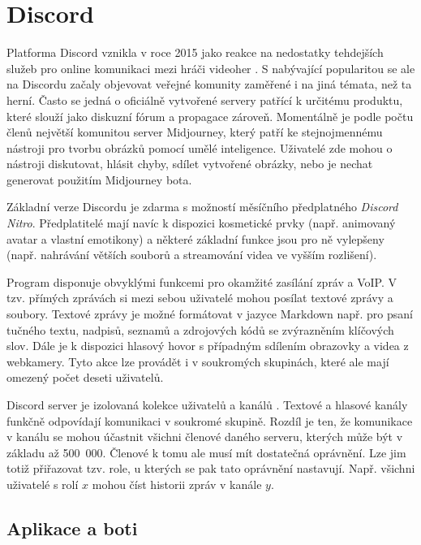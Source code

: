 \documentclass[FM]{tulthesis}
\begin{document}
	\section{Discord}
	
	Platforma Discord vznikla v roce 2015 jako reakce na nedostatky tehdejších služeb pro online komunikaci mezi hráči videoher \cite{lit_Discord}. S nabývající popularitou se ale na Discordu začaly objevovat veřejné komunity zaměřené i na jiná témata, než ta herní. Často se jedná o oficiálně vytvořené servery patřící k určitému produktu, které slouží jako diskuzní fórum a propagace zároveň. Momentálně je podle počtu členů největší komunitou server Midjourney, který patří ke stejnojmennému nástroji pro tvorbu obrázků pomocí umělé inteligence. Uživatelé zde mohou o nástroji diskutovat, hlásit chyby, sdílet vytvořené obrázky, nebo je nechat generovat použitím Midjourney bota.
	
	Základní verze Discordu je zdarma s možností měsíčního předplatného \textit{Discord Nitro}. Předplatitelé mají navíc k dispozici kosmetické prvky (např. animovaný avatar a vlastní emotikony) a některé základní funkce jsou pro ně vylepšeny (např. nahrávání větších souborů a streamování videa ve vyšším rozlišení).	

	Program disponuje obvyklými funkcemi pro okamžité zasílání zpráv a VoIP. V tzv. přímých zprávách si mezi sebou uživatelé mohou posílat textové zprávy a soubory. Textové zprávy je možné formátovat v jazyce Markdown např. pro psaní tučného textu, nadpisů, seznamů a zdrojových kódů se zvýrazněním klíčových slov. Dále je k dispozici hlasový hovor s případným sdílením obrazovky a videa z \mbox{webkamery}. Tyto akce lze provádět i v soukromých skupinách, které ale mají omezený počet deseti uživatelů.
	
	Discord server je izolovaná kolekce uživatelů a kanálů \cite{doc_Discord}. Textové a hlasové kanály funkčně odpovídají komunikaci v soukromé skupině. Rozdíl je ten, že komunikace v kanálu se mohou účastnit všichni členové daného serveru, kterých může být v základu až 500~000. Členové k tomu ale musí mít dostatečná oprávnění. Lze jim totiž přiřazovat tzv. role, u kterých se pak tato oprávnění nastavují. Např. všichni uživatelé s rolí $x$ mohou číst historii zpráv v kanále $y$.
	
	\subsection{Aplikace a boti}
	
\end{document}
